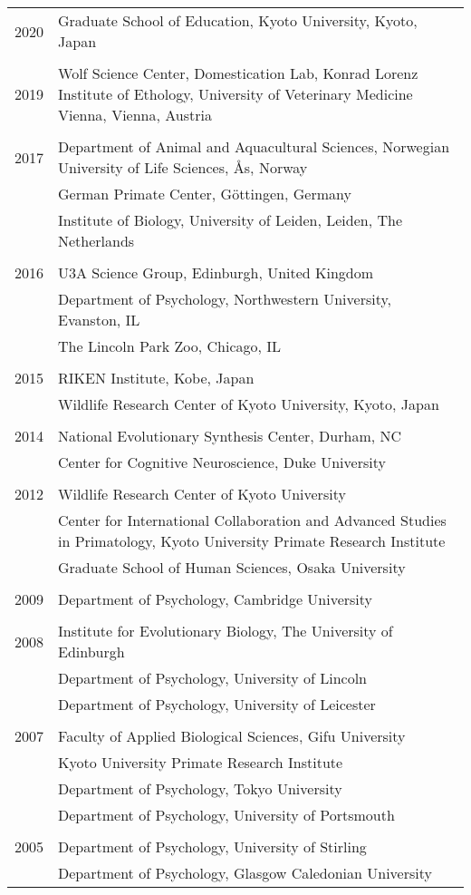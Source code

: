 \documentclass[11pt]{article}
\begin{document}
\begin{longtable}{p{3cm}p{12cm}}
2020 & Graduate School of Education, Kyoto University, Kyoto, Japan \\ \\
2019 & Wolf Science Center, Domestication Lab, Konrad Lorenz Institute
of Ethology, University of Veterinary Medicine Vienna, Vienna,
Austria\\ \\
2017 & Department of Animal and Aquacultural Sciences, Norwegian University of Life Sciences, {\AA}s, Norway \\
& German Primate Center, G\"{o}ttingen, Germany \\
& Institute of Biology, University of Leiden, Leiden, The
Netherlands \\ \\
2016 & U3A Science Group, Edinburgh, United Kingdom \\
& Department of Psychology, Northwestern University, Evanston, IL \\
& The Lincoln Park Zoo, Chicago, IL \\ \\
2015 & RIKEN Institute, Kobe, Japan \\ 
& Wildlife Research Center of Kyoto University, Kyoto, Japan \\ \\
2014 & National Evolutionary Synthesis Center, Durham, NC \\
& Center for Cognitive Neuroscience, Duke University \\ \\
2012 & Wildlife Research Center of Kyoto University \\
& Center for International Collaboration and Advanced Studies in
Primatology, Kyoto University Primate Research Institute \\
& Graduate School of Human Sciences, Osaka University \\ \\
2009 & Department of Psychology, Cambridge University \\ \\
2008 & Institute for Evolutionary Biology, The University of Edinburgh
\\
& Department of Psychology, University of Lincoln \\
& Department of Psychology, University of Leicester \\ \\
2007 & Faculty of Applied Biological Sciences, Gifu University \\
& Kyoto University Primate Research Institute \\
& Department of Psychology, Tokyo University \\
& Department of Psychology, University of Portsmouth \\ \\
2005 & Department of Psychology, University of Stirling \\
& Department of Psychology, Glasgow Caledonian University
\end{longtable}
\end{document}
